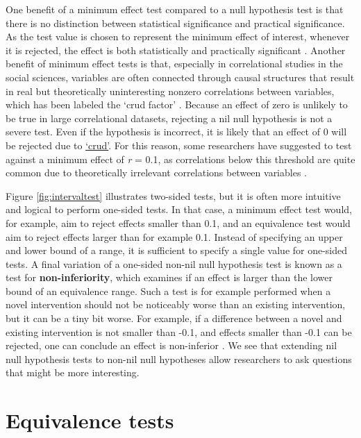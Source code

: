 \documentclass[
  oneside]{krantz}
\begin{document}
One benefit of a minimum effect test compared to a null hypothesis test is that there is no distinction between statistical significance and practical significance. As the test value is chosen to represent the minimum effect of interest, whenever it is rejected, the effect is both statistically and practically significant \citep{murphy_statistical_2014}. Another benefit of minimum effect tests is that, especially in correlational studies in the social sciences, variables are often connected through causal structures that result in real but theoretically uninteresting nonzero correlations between variables, which has been labeled the `crud factor' \citep{meehl_appraising_1990, orben_crud_2020}. Because an effect of zero is unlikely to be true in large correlational datasets, rejecting a nil null hypothesis is not a severe test. Even if the hypothesis is incorrect, it is likely that an effect of 0 will be rejected due to \protect\hyperlink{crud}{`crud'}. For this reason, some researchers have suggested to test against a minimum effect of \emph{r} = 0.1, as correlations below this threshold are quite common due to theoretically irrelevant correlations between variables \citep{ferguson_providing_2021}.

Figure \ref{fig:intervaltest} illustrates two-sided tests, but it is often more intuitive and logical to perform one-sided tests. In that case, a minimum effect test would, for example, aim to reject effects smaller than 0.1, and an equivalence test would aim to reject effects larger than for example 0.1. Instead of specifying an upper and lower bound of a range, it is sufficient to specify a single value for one-sided tests. A final variation of a one-sided non-nil null hypothesis test is known as a test for \textbf{non-inferiority}, which examines if an effect is larger than the lower bound of an equivalence range. Such a test is for example performed when a novel intervention should not be noticeably worse than an existing intervention, but it can be a tiny bit worse. For example, if a difference between a novel and existing intervention is not smaller than -0.1, and effects smaller than -0.1 can be rejected, one can conclude an effect is non-inferior \citep{schumi_through_2011, mazzolari_myths_2022}. We see that extending nil null hypothesis tests to non-nil null hypotheses allow researchers to ask questions that might be more interesting.

\hypertarget{equivalence-tests}{%
\section{Equivalence tests}\label{equivalence-tests}}
\end{document}
